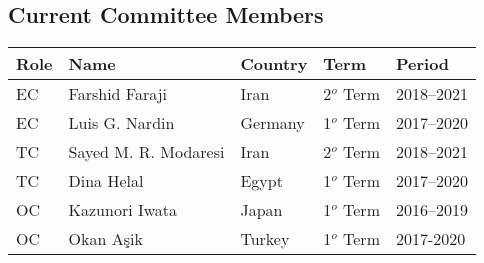 \documentclass{article}
\begin{document}
\subsection{Current Committee Members}
\begin{table}[H]
\begin{tabular}{lllll}
  \toprule
  \textbf{Role}   & \textbf{Name}         & \textbf{Country}  & \textbf{Term} &
  \textbf{Period}\\
    \midrule
    EC            & Farshid Faraji        & Iran              & 2${^o}$ Term  &
    2018--2021\\
    \hline
    EC            & Luis G. Nardin        & Germany           & 1${^o}$ Term  &
    2017--2020\\
    \hline
    TC            & Sayed M. R. Modaresi  & Iran              & 2${^o}$ Term  &
    2018--2021\\
    \hline
    TC            & Dina Helal            & Egypt             & 1${^o}$ Term  &
    2017--2020\\
    \hline
    OC            & Kazunori Iwata        & Japan             & 1${^o}$ Term  &
    2016--2019\\
    \hline
    OC            & Okan A{\c s}ik        & Turkey            & 1${^o}$ Term  &
    2017-2020\\
    \bottomrule
\end{tabular}
\end{table}
\end{document}
